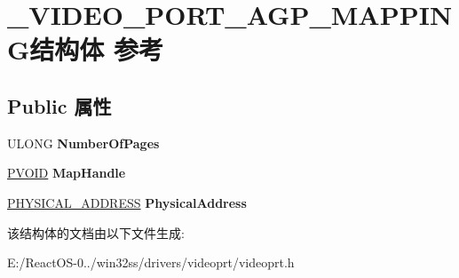 \hypertarget{struct___v_i_d_e_o___p_o_r_t___a_g_p___m_a_p_p_i_n_g}{}\section{\+\_\+\+V\+I\+D\+E\+O\+\_\+\+P\+O\+R\+T\+\_\+\+A\+G\+P\+\_\+\+M\+A\+P\+P\+I\+N\+G结构体 参考}
\label{struct___v_i_d_e_o___p_o_r_t___a_g_p___m_a_p_p_i_n_g}
\subsection*{Public 属性}
\begin{DoxyCompactItemize}
\item 
\mbox{\label{struct___v_i_d_e_o___p_o_r_t___a_g_p___m_a_p_p_i_n_g_a9eb06c8f53c10b3adcce8018ccbfaa69}} 
U\+L\+O\+NG {\bfseries Number\+Of\+Pages}
\item 
\mbox{\label{struct___v_i_d_e_o___p_o_r_t___a_g_p___m_a_p_p_i_n_g_a00f66fdc4c131514d690cf17fbc44ad6}} 
\hyperlink{interfacevoid}{P\+V\+O\+ID} {\bfseries Map\+Handle}
\item 
\mbox{\label{struct___v_i_d_e_o___p_o_r_t___a_g_p___m_a_p_p_i_n_g_ae4f5d4d7bb87c62598e200e1853ee16f}} 
\hyperlink{union___l_a_r_g_e___i_n_t_e_g_e_r}{P\+H\+Y\+S\+I\+C\+A\+L\+\_\+\+A\+D\+D\+R\+E\+SS} {\bfseries Physical\+Address}
\end{DoxyCompactItemize}


该结构体的文档由以下文件生成\+:\begin{DoxyCompactItemize}
\item 
E\+:/\+React\+O\+S-\/0../win32ss/drivers/videoprt/videoprt.\+h\end{DoxyCompactItemize}
